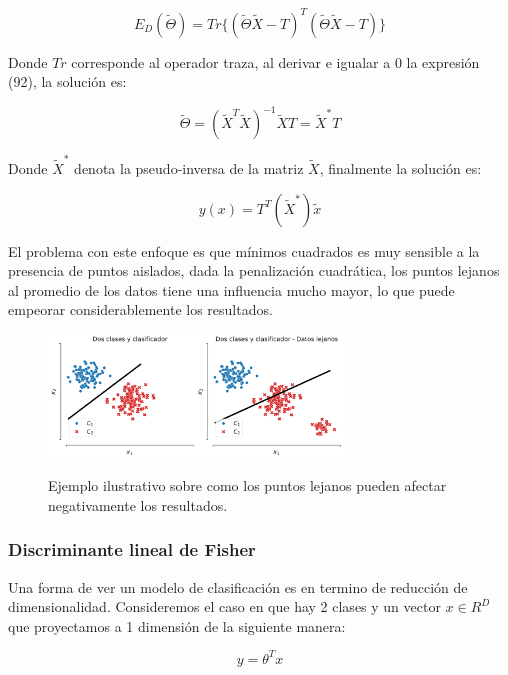 \begin{equation}
    E_D(\tilde{\Theta}) = Tr\{(\tilde{\Theta}\tilde{X}-T)^T(\tilde{\Theta}\tilde{X}-T)\}
\end{equation}

Donde $Tr$ corresponde al operador traza, al derivar e igualar a 0 la expresión (92), la solución es:

\begin{equation}
    \tilde{\Theta} = (\tilde{X}^T\tilde{X})^{-1}\tilde{X}T = \tilde{X}^*T
\end{equation}

Donde $\tilde{X}^*$ denota la pseudo-inversa de la matriz $\tilde{X}$, finalmente la solución es:

\begin{equation}
y(x) = T^T(\tilde{X}^*)\tilde{x}
\end{equation}

El problema con este enfoque es que mínimos cuadrados es muy sensible a la presencia de puntos aislados, dada la penalización cuadrática, los puntos lejanos al promedio de los datos tiene una influencia mucho mayor, lo que puede empeorar considerablemente los resultados.


\begin{figure}[H]
    \centering
    \includegraphics[width=0.7\textwidth]{img/cap2_dosclases_clasificador.pdf}\\
    \caption{Ejemplo ilustrativo sobre como los puntos lejanos pueden afectar negativamente los resultados.}
    \label{fig:clasif_mse}
\end{figure}

\subsubsection{Discriminante lineal de Fisher}

Una forma de ver un modelo de clasificación es en termino de reducción de dimensionalidad. Consideremos el caso en que hay 2 clases y un vector $x\in R^D$ que proyectamos a 1 dimensión de la siguiente manera:

\begin{equation}
    y = \theta^Tx
\end{equation}


